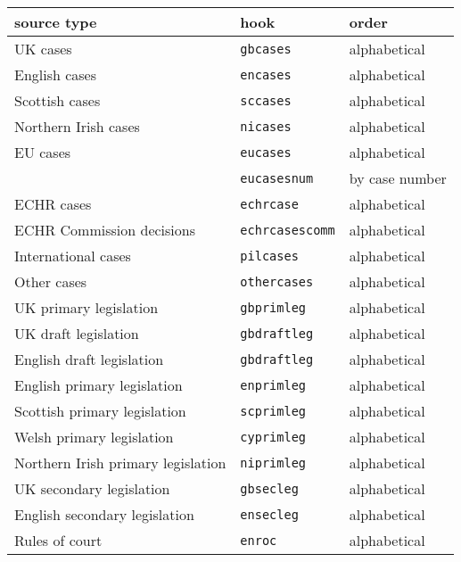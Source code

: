 \documentclass[a4paper,
               11pt,
	       DIV=1,			   
	       footinclude=false]
	      {scrartcl}
\begin{document}
\begin{table}
\centering
\small
{}
\begin{tabular}{lll}
\toprule
source type                          & hook                  & order \\
\midrule
UK cases                             & \texttt{gbcases}      & alphabetical\\
English cases                        & \texttt{encases}      & alphabetical\\
Scottish cases                       & \texttt{sccases}      & alphabetical\\
Northern Irish cases                 & \texttt{nicases}      & alphabetical\\
EU cases                             & \texttt{eucases}      & alphabetical \\
                                     & \texttt{eucasesnum}   & by case number \\
ECHR cases                           & \texttt{echrcase}     & alphabetical \\
ECHR Commission decisions            & \texttt{echrcasescomm}& alphabetical \\
International cases                  & \texttt{pilcases}     & alphabetical \\
Other cases                          & \texttt{othercases}   & alphabetical \\
UK primary legislation               & \texttt{gbprimleg}    & alphabetical \\
UK draft legislation                 & \texttt{gbdraftleg}   & alphabetical \\
English draft legislation            & \texttt{gbdraftleg}   & alphabetical \\
English primary legislation          & \texttt{enprimleg}    & alphabetical \\
Scottish primary legislation         & \texttt{scprimleg}    & alphabetical \\
Welsh primary legislation            & \texttt{cyprimleg}    & alphabetical \\
Northern Irish primary legislation   & \texttt{niprimleg}    & alphabetical \\
UK secondary legislation             & \texttt{gbsecleg}     & alphabetical \\
English secondary legislation        & \texttt{ensecleg}     & alphabetical \\
Rules of court                       & \texttt{enroc}        & alphabetical \\

\end{tabular}
\end{table}
\end{document}
